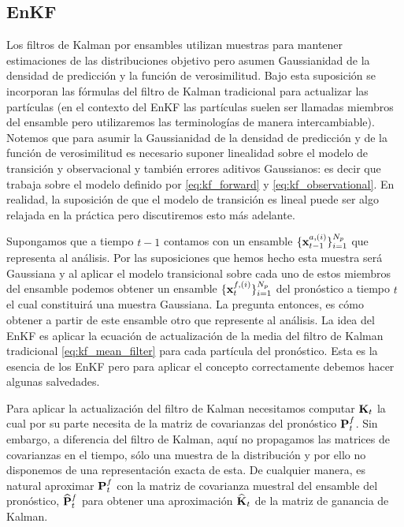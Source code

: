 \subsection{EnKF} \label{sec:enkf}
Los filtros de Kalman por ensambles utilizan muestras para mantener estimaciones de las distribuciones objetivo pero asumen Gaussianidad de la densidad de predicción y la función  de verosimilitud. Bajo esta suposición se incorporan las fórmulas del filtro de Kalman tradicional para actualizar las partículas (en el contexto del EnKF las partículas suelen ser llamadas miembros del ensamble pero utilizaremos las terminologías de manera intercambiable). Notemos que para asumir la Gaussianidad de la densidad de predicción y de la función de verosimilitud es necesario suponer linealidad sobre el modelo de transición y observacional y también errores aditivos Gaussianos: es decir que trabaja sobre el modelo definido por \ref{eq:kf_forward} y \ref{eq:kf_observational}. En realidad, la suposición de que el modelo de transición es lineal puede ser algo relajada en la práctica pero discutiremos esto más adelante. 

Supongamos que a tiempo $t-1$ contamos con un ensamble $\{ \mathbf{x}_{t-1}^{a, (i)} \}_{i=1}^{N_p}$ que representa al análisis. Por las suposiciones que hemos hecho esta muestra será Gaussiana y al aplicar el modelo transicional sobre cada uno de estos miembros del ensamble podemos obtener un ensamble $\{ \mathbf{x}_{t}^{f, (i)} \}_{i=1}^{N_p}$ del pronóstico a tiempo $t$ el cual constituirá una muestra Gaussiana. La pregunta entonces, es cómo obtener a partir de este ensamble otro que represente al análisis. La idea del EnKF es aplicar la ecuación de actualización de la media del filtro de Kalman tradicional \ref{eq:kf_mean_filter} para cada partícula del pronóstico. Esta es la esencia de los EnKF pero para aplicar el concepto correctamente debemos hacer algunas salvedades.

Para aplicar la actualización del filtro de Kalman necesitamos computar $\mathbf{K}_t$ la cual por su parte necesita de la matriz de covarianzas del pronóstico $\mathbf{P}_t^f$. Sin embargo, a diferencia del filtro de Kalman, aquí no propagamos las matrices de covarianzas en el tiempo, sólo una muestra de la distribución y por ello no disponemos de una representación exacta de esta. De cualquier manera, es natural aproximar $\mathbf{P}_t^f$ con la matriz de covarianza muestral del ensamble del pronóstico, $\widehat{\mathbf{P}}_t^f$ para obtener una aproximación $\widehat{\mathbf{K}}_t$ de la matriz de ganancia de Kalman.

